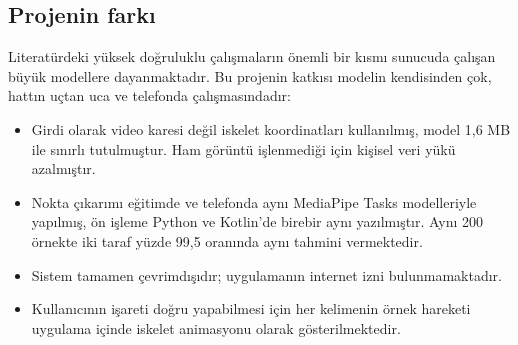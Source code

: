 \subsection{Projenin farkı}

Literatürdeki yüksek doğruluklu çalışmaların önemli bir kısmı sunucuda çalışan büyük
modellere dayanmaktadır. Bu projenin katkısı modelin kendisinden çok, hattın uçtan uca
ve telefonda çalışmasındadır:

\begin{itemize}
  \item Girdi olarak video karesi değil iskelet koordinatları kullanılmış, model 1,6 MB
        ile sınırlı tutulmuştur. Ham görüntü işlenmediği için kişisel veri yükü azalmıştır.
  \item Nokta çıkarımı eğitimde ve telefonda aynı MediaPipe Tasks modelleriyle
        yapılmış, ön işleme Python ve Kotlin'de birebir aynı yazılmıştır. Aynı 200 örnekte
        iki taraf yüzde 99,5 oranında aynı tahmini vermektedir.
  \item Sistem tamamen çevrimdışıdır; uygulamanın internet izni bulunmamaktadır.
  \item Kullanıcının işareti doğru yapabilmesi için her kelimenin örnek hareketi
        uygulama içinde iskelet animasyonu olarak gösterilmektedir.
\end{itemize}
